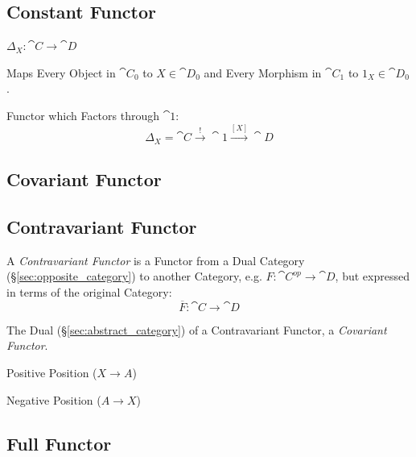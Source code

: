 \subsection{Constant Functor}\label{sec:constant_functor}

$\Delta_X : \cat{C} \rightarrow \cat{D}$

Maps Every Object in $\cat{C}_0$ to $X \in \cat{D}_0$ and Every
Morphism in $\cat{C}_1$ to $1_X \in \cat{D}_0$.

Functor which Factors through $\cat{1}$:
\[
  \Delta_X = \cat{C} \xrightarrow{\;\;!\;\;} \cat{1}
    \xrightarrow{[X]} \cat{D}
\]



\subsection{Covariant Functor} \label{sec:covariant_functor}

\subsection{Contravariant Functor} \label{sec:contravariant_functor}

A \emph{Contravariant Functor} is a Functor from a Dual Category
(\S\ref{sec:opposite_category}) to another Category, e.g. $F :
\cat{C^{op}} \rightarrow \cat{D}$, but expressed in terms of the
original Category:
\[
  \overline{F} : \cat{C} \rightarrow \cat{D}
\]

The Dual (\S\ref{sec:abstract_category}) of a Contravariant
Functor, a \emph{Covariant Functor}.

Positive Position ($X \rightarrow A$)

Negative Position ($A \rightarrow X$)



\subsection{Full Functor}\label{sec:full_functor}

